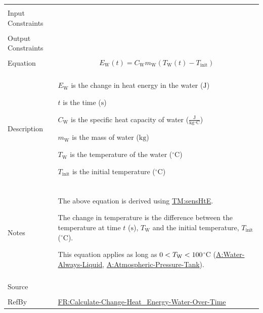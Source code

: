 \documentclass[12pt]{article}
\newcommand{\lt}{\ensuremath <}
\begin{document}
\begin{minipage}{\textwidth}
\begin{tabular}{>{\raggedright}p{}>{\raggedright\arraybackslash}p{}}
\\ \midrule \\
Input Constraints & 
\\ \midrule \\
Output Constraints & 
\\ \midrule \\
Equation & \begin{displaymath}
           {E_{\text{W}}}\left(t\right)={C_{\text{W}}} {m_{\text{W}}} \left({T_{\text{W}}}\left(t\right)-{T_{\text{init}}}\right)
           \end{displaymath}
\\ \midrule \\
Description & \begin{symbDescription}
              \item{${E_{\text{W}}}$ is the change in heat energy in the water (${\text{J}}$)}
              \item{$t$ is the time (${\text{s}}$)}
              \item{${C_{\text{W}}}$ is the specific heat capacity of water ($\frac{\text{J}}{\text{kg}{}^{\circ}\text{C}}$)}
              \item{${m_{\text{W}}}$ is the mass of water (${\text{kg}}$)}
              \item{${T_{\text{W}}}$ is the temperature of the water (${{}^{\circ}\text{C}}$)}
              \item{${T_{\text{init}}}$ is the initial temperature (${{}^{\circ}\text{C}}$)}
              \end{symbDescription}
\\ \midrule \\
Notes & The above equation is derived using \hyperref[TM:sensHtE]{TM:sensHtE}.
        
        The change in temperature is the difference between the temperature at time $t$ (${\text{s}}$), ${T_{\text{W}}}$ and the initial temperature, ${T_{\text{init}}}$ (${{}^{\circ}\text{C}}$).
        
        This equation applies as long as $0\lt{}{T_{\text{W}}}\lt{}100$${{}^{\circ}\text{C}}$ (\hyperref[assumpWAL]{A:Water-Always-Liquid}, \hyperref[assumpAPT]{A:Atmospheric-Pressure-Tank}).
        
\\ \midrule \\
Source & \cite{koothoor2013}
         
\\ \midrule \\
RefBy & \hyperref[calcChgHeatEnergyWtrOverTime]{FR:Calculate-Change-Heat\_Energy-Water-Over-Time}
        
\\ \bottomrule
\end{tabular}
\end{minipage}
\end{document}
